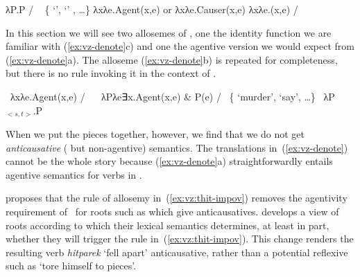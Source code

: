 \begin{exe}
\begin{xlist}
\begin{xlist}
\begin{exe}
\begin{xlist}
\begin{xlist}
\begin{exe}
\begin{xlist}
\begin{xlist}
\begin{exe}
\begin{exe}
\begin{xlist}
\begin{exe}
\begin{exe}
\begin{xlist}
\begin{exe}
\begin{exe}
\begin{exe}
\begin{exe}
\begin{exe}
\begin{xlist}
\begin{exe}
\begin{xlist}
\begin{exe}
\begin{exe}
\begin{xlist}
\begin{exe}
\begin{xlist}
\begin{exe}
\begin{xlist}
\begin{exe}
\begin{exe}
\begin{exe}
\begin{xlist}
\begin{exe}
\begin{exe}
\begin{exe}
\begin{xlist}
\begin{exe}
\begin{xlist}
\begin{exe}
\begin{xlist}
\begin{exe}
\begin{xlist}
\begin{exe}
\begin{exe}
\begin{exe}
\begin{exe}
\begin{xlist}
\begin{exe}
\begin{xlist}
\begin{exe}
\begin{xlist}
\begin{exe}
\begin{xlist}
\begin{exe}
\begin{xlist}
\begin{exe}
\begin{xlist}
\begin{exe}
\begin{exe}
\begin{exe}
\begin{exe}
\begin{xlist}
\begin{exe}
\begin{xlist}
\begin{exe}
\begin{xlist}
\begin{exe}
\begin{exe}
\begin{xlist}
\begin{exe}
\begin{xlist}
\begin{exe}
\begin{exe}
\begin{exe}
\begin{exe}
\begin{xlist}
\begin{xlist}
\begin{exe}
\begin{xlist}
\begin{exe}
\begin{exe}
\begin{exe}
\begin{xlist}
\begin{exe}
\begin{exe}
\begin{xlist}
\begin{exe}
\begin{exe}
\begin{exe}
\begin{xlist}
\begin{xlist}
\begin{exe}
\begin{xlist}
\begin{exe}
\begin{exe}
\begin{exe}
\begin{exe}
\begin{xlist}
\begin{exe}
\begin{xlist}
\begin{exe}
 \begin{xlist} 
 	\ex  λP.P \phantom{agent(x,e)xxx} / \trace~ \{  `',  `' , \dots \} 
 	\ex  λxλe.Agent(x,e) or λxλe.Causer(x,e) 
 	\ex  λxλe.(x,e) / \trace~\va 
 \z
\z 

In this section we will see two allosemes of {\vz}, one the identity function we are familiar with (\ref{ex:vz-denote}c) and one the agentive version we would expect from {\va} (\ref{ex:vz-denote}a). The  alloseme (\ref{ex:vz-denote}b) is repeated for completeness, but there is no rule invoking it in the context of {\va}.
 \begin{exe}
 \ex  \label{ex:vz-denote} 
 \begin{xlist} 
 	\ex  \denote{\vz} \lra~λxλe.Agent(x,e) / \trace~\va 
 	\ex  \denote{\vz} \lra~λPλe∃x.Agent(x,e) \& P(e) / \trace~\{ `murder',  `say’, \dots\} 
 	\ex  \denote{\vz} \lra~λP$_{<s,t>}$.P 
 \z
\z 

When we put the pieces together, however, we find that we do not get \textit{anticausative} ( but non-agentive) semantics. The translations in~(\ref{ex:vz-denote}) cannot be the whole story because (\ref{ex:vz-denote}a) straightforwardly entails agentive semantics for verbs in {\thit}.

\cite{kastner17gjgl} proposes that the rule of allosemy in~(\ref{ex:vz:thit-impov}) removes the agentivity requirement of {\va}~for roots such as  which give anticausatives. \cite{kastner16phd,kastner17gjgl} develops a view of roots according to which their lexical semantics determines, at least in part, whether they will trigger the rule in~(\ref{ex:vz:thit-impov}). This change renders the resulting verb \emph{hitparek} `fell apart' anticausative, rather than a potential reflexive such as `tore himself to pieces'.
 \begin{exe}
\ex 
\end{exe}
\end{xlist}
\end{exe}
\end{xlist}
\end{exe}
\end{xlist}
\end{exe}
\end{xlist}
\end{exe}
\end{exe}
\end{exe}
\end{exe}
\end{xlist}
\end{exe}
\end{xlist}
\end{xlist}
\end{exe}
\end{exe}
\end{exe}
\end{xlist}
\end{exe}
\end{exe}
\end{xlist}
\end{exe}
\end{exe}
\end{exe}
\end{xlist}
\end{exe}
\end{xlist}
\end{xlist}
\end{exe}
\end{exe}
\end{exe}
\end{exe}
\end{xlist}
\end{exe}
\end{xlist}
\end{exe}
\end{exe}
\end{xlist}
\end{exe}
\end{xlist}
\end{exe}
\end{xlist}
\end{exe}
\end{exe}
\end{exe}
\end{exe}
\end{xlist}
\end{exe}
\end{xlist}
\end{exe}
\end{xlist}
\end{exe}
\end{xlist}
\end{exe}
\end{xlist}
\end{exe}
\end{xlist}
\end{exe}
\end{exe}
\end{exe}
\end{exe}
\end{xlist}
\end{exe}
\end{xlist}
\end{exe}
\end{xlist}
\end{exe}
\end{xlist}
\end{exe}
\end{exe}
\end{exe}
\end{xlist}
\end{exe}
\end{exe}
\end{exe}
\end{xlist}
\end{exe}
\end{xlist}
\end{exe}
\end{xlist}
\end{exe}
\end{exe}
\end{xlist}
\end{exe}
\end{xlist}
\end{exe}
\end{exe}
\end{exe}
\end{exe}
\end{exe}
\end{xlist}
\end{exe}
\end{exe}
\end{xlist}
\end{exe}
\end{exe}
\end{xlist}
\end{xlist}
\end{exe}
\end{xlist}
\end{xlist}
\end{exe}
\end{xlist}
\end{xlist}
\end{exe}
